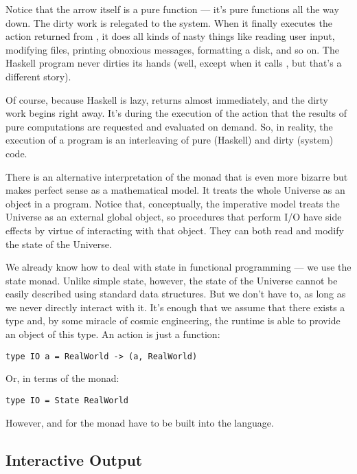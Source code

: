 Notice that the arrow itself is a pure function --- it's pure functions
all the way down. The dirty work is relegated to the system. When it
finally executes the  action returned from , it
does all kinds of nasty things like reading user input, modifying files,
printing obnoxious messages, formatting a disk, and so on. The Haskell
program never dirties its hands (well, except when it calls
, but that's a different story).

Of course, because Haskell is lazy,  returns almost
immediately, and the dirty work begins right away. It's during the
execution of the  action that the results of pure
computations are requested and evaluated on demand. So, in reality, the
execution of a program is an interleaving of pure (Haskell) and dirty
(system) code.

There is an alternative interpretation of the  monad that is
even more bizarre but makes perfect sense as a mathematical model. It
treats the whole Universe as an object in a program. Notice that,
conceptually, the imperative model treats the Universe as an external
global object, so procedures that perform I/O have side effects by
virtue of interacting with that object. They can both read and modify
the state of the Universe.

We already know how to deal with state in functional programming --- we
use the state monad. Unlike simple state, however, the state of the
Universe cannot be easily described using standard data structures. But
we don't have to, as long as we never directly interact with it. It's
enough that we assume that there exists a type  and,
by some miracle of cosmic engineering, the runtime is able to provide an
object of this type. An  action is just a function:

\begin{verbatim}
type IO a = RealWorld -> (a, RealWorld)
\end{verbatim}
Or, in terms of the  monad:

\begin{verbatim}
type IO = State RealWorld
\end{verbatim}
However, \code{>=>} and  for
the  monad have to be built into the language.

\subsection{Interactive Output}\label{interactive-output}

